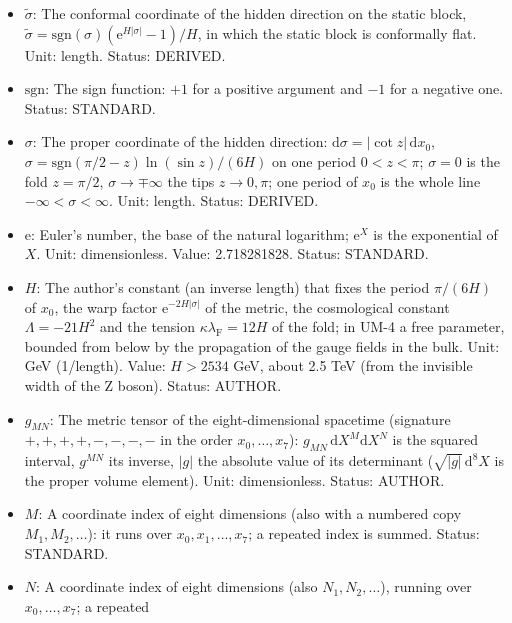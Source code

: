 \documentclass[
  10pt,
]{article}
\providecommand{\tightlist}{%
  \setlength{\itemsep}{0pt}\setlength{\parskip}{0pt}}
\begin{document}
\begin{itemize}
\tightlist
\item
  \(\tilde\sigma\): The conformal coordinate of the hidden direction on
  the static block,
  \(\tilde\sigma = \mathrm{sgn}(\sigma)(\mathrm{e}^{H\lvert\sigma\rvert} - 1)/H\),
  in which the static block is conformally flat. Unit: length. Status:
  DERIVED.
\item
  \(\mathrm{sgn}\): The sign function: \(+1\) for a positive argument
  and \(-1\) for a negative one. Status: STANDARD.
\item
  \(\sigma\): The proper coordinate of the hidden direction:
  \(\mathrm{d}\sigma = \lvert\cot z\rvert\,\mathrm{d}x_0\),
  \(\sigma = \mathrm{sgn}(\pi/2 - z)\ln(\sin z)/(6H)\) on one period
  \(0 < z < \pi\); \(\sigma = 0\) is the fold \(z = \pi/2\),
  \(\sigma \to \mp\infty\) the tips \(z \to 0, \pi\); one period of
  \(x_0\) is the whole line \(-\infty < \sigma < \infty\). Unit: length.
  Status: DERIVED.
\item
  \(\mathrm{e}\): Euler's number, the base of the natural logarithm;
  \(\mathrm{e}^{X}\) is the exponential of \(X\). Unit: dimensionless.
  Value: 2.718281828. Status: STANDARD.
\item
  \(H\): The author's constant (an inverse length) that fixes the period
  \(\pi/(6H)\) of \(x_0\), the warp factor
  \(\mathrm{e}^{-2H\lvert\sigma\rvert}\) of the metric, the cosmological
  constant \(\Lambda = -21H^2\) and the tension
  \(\kappa\lambda_{\mathrm{F}} = 12H\) of the fold; in UM-4 a free
  parameter, bounded from below by the propagation of the gauge fields
  in the bulk. Unit: GeV (1/length). Value: \(H > 2534\) GeV, about 2.5
  TeV (from the invisible width of the Z boson). Status: AUTHOR.
\item
  \(g_{MN}\): The metric tensor of the eight-dimensional spacetime
  (signature \(+,+,+,+,-,-,-,-\) in the order \(x_0, \dots, x_7\)):
  \(g_{MN}\,\mathrm{d}X^M\mathrm{d}X^N\) is the squared interval,
  \(g^{MN}\) its inverse, \(\lvert g\rvert\) the absolute value of its
  determinant (\(\sqrt{\lvert g\rvert}\,\mathrm{d}^8X\) is the proper
  volume element). Unit: dimensionless. Status: AUTHOR.
\item
  \(M\): A coordinate index of eight dimensions (also with a numbered
  copy \(M_1, M_2, \dots\)): it runs over \(x_0, x_1, \dots, x_7\); a
  repeated index is summed. Status: STANDARD.
\item
  \(N\): A coordinate index of eight dimensions (also
  \(N_1, N_2, \dots\)), running over \(x_0, \dots, x_7\); a repeated

\end{itemize}
\end{document}
